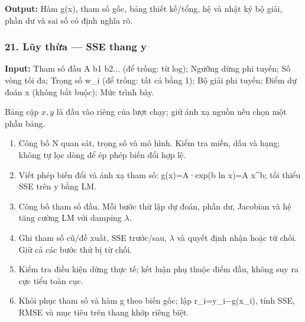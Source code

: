 \textbf{Output:} Hàm g(\allowbreak{}x),\allowbreak{} tham số gốc,\allowbreak{} bảng thiết kế/\allowbreak{}tổng,\allowbreak{} hệ và nhật ký bộ giải,\allowbreak{} phần dư và sai số có định nghĩa rõ.

\examplebreak\subsubsection*{21. Lũy thừa — SSE thang y}

\textbf{Input:} Tham số đầu A b1 b2... (\allowbreak{}để trống: từ log);\allowbreak{} Ngưỡng dừng phi tuyến;\allowbreak{} Số vòng tối đa;\allowbreak{} Trọng số w\_i (\allowbreak{}để trống: tất cả bằng 1);\allowbreak{} Bộ giải phi tuyến;\allowbreak{} Điểm dự đoán x (\allowbreak{}không bắt buộc);\allowbreak{} Mức trình bày.

Bảng cặp $x,y$ là đầu vào riêng của lượt chạy; giữ ánh xạ nguồn nếu chọn một phần bảng.

\begin{enumerate}

\item Công bố N quan sát,\allowbreak{} trọng số và mô hình. Kiểm tra miền,\allowbreak{} dấu và hạng;\allowbreak{} không tự lọc dòng để ép phép biến đổi hợp lệ.

\item Viết phép biến đổi và ánh xạ tham số: g(\allowbreak{}x)=\allowbreak{}A·exp(\allowbreak{}b ln x)=\allowbreak{}A x\textasciicircum{}b;\allowbreak{} tối thiểu SSE trên y bằng LM.

\item Công bố tham số đầu. Mỗi bước thử lập dự đoán,\allowbreak{} phần dư,\allowbreak{} Jacobian và hệ tăng cường LM với damping \ensuremath{\lambda}.

\item Ghi tham số cũ/\allowbreak{}đề xuất,\allowbreak{} SSE trước/\allowbreak{}sau,\allowbreak{} \ensuremath{\lambda} và quyết định nhận hoặc từ chối. Giữ cả các bước thử bị từ chối.

\item Kiểm tra điều kiện dừng thực tế;\allowbreak{} kết luận phụ thuộc điểm đầu,\allowbreak{} không suy ra cực tiểu toàn cục.

\item Khôi phục tham số và hàm g theo biến gốc;\allowbreak{} lập r\_i=\allowbreak{}y\_i\ensuremath{-}g(\allowbreak{}x\_i),\allowbreak{} tính SSE,\allowbreak{} RMSE và mục tiêu trên thang khớp riêng biệt.

\end{enumerate}

